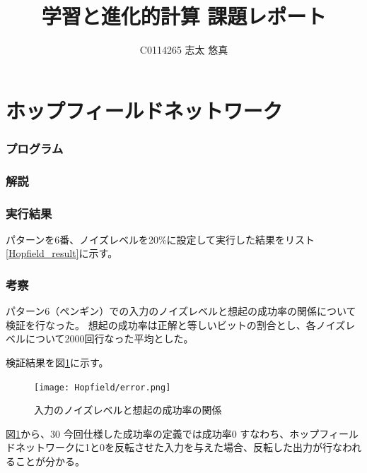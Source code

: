 \documentclass{jsarticle}
\title{学習と進化的計算 課題レポート}
\author{C0114265 志太 悠真}
\begin{document}
\maketitle

\tableofcontents

\part{ホップフィールドネットワーク}
\section{プログラム}


\section{解説}


\section{実行結果}
パターンを6番、ノイズレベルを20\%に設定して実行した結果をリスト\ref{Hopfield_result}に示す。


\section{考察}
パターン6（ペンギン）での入力のノイズレベルと想起の成功率の関係について検証を行なった。
想起の成功率は正解と等しいビットの割合とし、各ノイズレベルについて2000回行なった平均とした。

検証結果を図\ref{noise_success_rate}に示す。
\begin{figure}[H]
	\begin{center}
		\texttt{[image: Hopfield/error.png]}
		\caption{入力のノイズレベルと想起の成功率の関係\label{noise_success_rate}}
	\end{center}
\end{figure}

図\ref{noise_success_rate}から、30%
今回仕様した成功率の定義では成功率0%
すなわち、ホップフィールドネットワークに1と0を反転させた入力を与えた場合、反転した出力が行なわれることが分かる。
\end{document}
